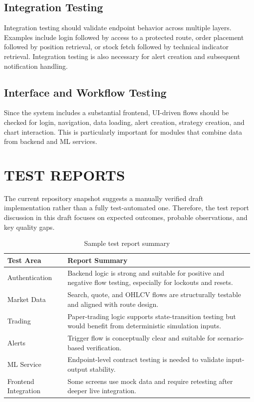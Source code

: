 \documentclass[12pt,a4paper]{report}
\begin{document}
\subsection{Integration Testing}
Integration testing should validate endpoint behavior across multiple layers. Examples include login followed by access to a protected route, order placement followed by position retrieval, or stock fetch followed by technical indicator retrieval. Integration testing is also necessary for alert creation and subsequent notification handling.

\subsection{Interface and Workflow Testing}
Since the system includes a substantial frontend, UI-driven flows should be checked for login, navigation, data loading, alert creation, strategy creation, and chart interaction. This is particularly important for modules that combine data from backend and ML services.

\section{TEST REPORTS}
The current repository snapshot suggests a manually verified draft implementation rather than a fully test-automated one. Therefore, the test report discussion in this draft focuses on expected outcomes, probable observations, and key quality gaps.

\begin{table}[H]
\centering
\caption{Sample test report summary}
\begin{tabularx}{\textwidth}{>{\raggedright\arraybackslash}p{2.2in} X}
\toprule
\textbf{Test Area} & \textbf{Report Summary} \\
\midrule
Authentication & Backend logic is strong and suitable for positive and negative flow testing, especially for lockouts and resets. \\
Market Data & Search, quote, and OHLCV flows are structurally testable and aligned with route design. \\
Trading & Paper-trading logic supports state-transition testing but would benefit from deterministic simulation inputs. \\
Alerts & Trigger flow is conceptually clear and suitable for scenario-based verification. \\
ML Service & Endpoint-level contract testing is needed to validate input-output stability. \\
Frontend Integration & Some screens use mock data and require retesting after deeper live integration. \\
\bottomrule
\end{tabularx}
\end{table}
\end{document}

